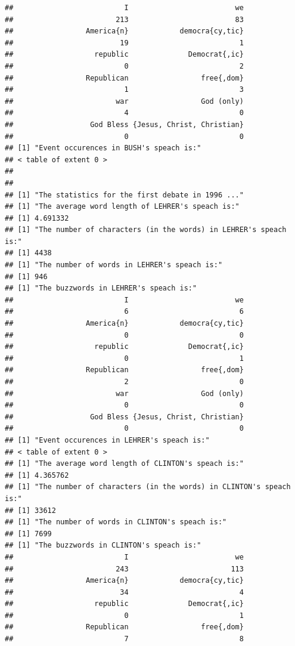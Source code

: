 \documentclass{article}\usepackage[]{graphicx}\usepackage[]{color}
\makeatletter
\newenvironment{kframe}{%
 \def\at@end@of@kframe{}%
 \ifinner\ifhmode%
  \def\at@end@of@kframe{\end{minipage}}%
  \begin{minipage}{\columnwidth}%
 \fi\fi%
 \def\FrameCommand##1{\hskip\@totalleftmargin \hskip-\fboxsep
 \colorbox{shadecolor}{##1}\hskip-\fboxsep
     \hskip-\linewidth \hskip-\@totalleftmargin \hskip\columnwidth}%
 \MakeFramed {\advance\hsize-\width
   \@totalleftmargin\z@ \linewidth\hsize
   \@setminipage}}%
 {\par\unskip\endMakeFramed%
 \at@end@of@kframe}
\newenvironment{knitrout}{}{} %
\makeatother
\begin{document}
\begin{knitrout}
\begin{kframe}
\begin{verbatim}
##                          I                         we 
##                        213                         83 
##                 America{n}            democra{cy,tic} 
##                         19                          1 
##                   republic              Democrat{,ic} 
##                          0                          2 
##                 Republican                 free{,dom} 
##                          1                          3 
##                        war                 God (only) 
##                          4                          0 
##                  God Bless {Jesus, Christ, Christian} 
##                          0                          0 
## [1] "Event occurences in BUSH's speach is:"
## < table of extent 0 >
## 
## 
## [1] "The statistics for the first debate in 1996 ..."
## [1] "The average word length of LEHRER's speach is:"
## [1] 4.691332
## [1] "The number of characters (in the words) in LEHRER's speach is:"
## [1] 4438
## [1] "The number of words in LEHRER's speach is:"
## [1] 946
## [1] "The buzzwords in LEHRER's speach is:"
##                          I                         we 
##                          6                          6 
##                 America{n}            democra{cy,tic} 
##                          0                          0 
##                   republic              Democrat{,ic} 
##                          0                          1 
##                 Republican                 free{,dom} 
##                          2                          0 
##                        war                 God (only) 
##                          0                          0 
##                  God Bless {Jesus, Christ, Christian} 
##                          0                          0 
## [1] "Event occurences in LEHRER's speach is:"
## < table of extent 0 >
## [1] "The average word length of CLINTON's speach is:"
## [1] 4.365762
## [1] "The number of characters (in the words) in CLINTON's speach is:"
## [1] 33612
## [1] "The number of words in CLINTON's speach is:"
## [1] 7699
## [1] "The buzzwords in CLINTON's speach is:"
##                          I                         we 
##                        243                        113 
##                 America{n}            democra{cy,tic} 
##                         34                          4 
##                   republic              Democrat{,ic} 
##                          0                          1 
##                 Republican                 free{,dom} 
##                          7                          8 

\end{verbatim}
\end{kframe}
\end{knitrout}
\end{document}
